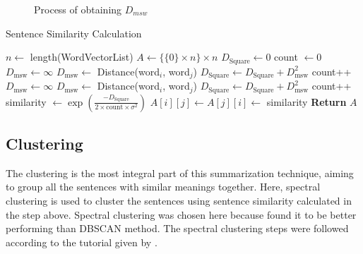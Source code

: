 \begin{figure}
    \centering
    
    \caption{Process of obtaining $D_{msw}$}
    \label{fig:msd}
\end{figure}
\begin{algorithm} \caption{Sentence Similarity Calculation} \label{alg:similarity}
\begin{algorithmic}[1]
    \State $n \gets$ length(WordVectorList)
    \State $A \gets \{ \{0\} \times n \} \times n$
        \State $D_{\text{Square}} \gets 0$
        \State count $\gets 0$
                \State $D_{\text{msw}} \gets \infty$
                        \State $D_{\text{msw}} \gets$ Distance(word$_i$, word$_j$)
                    \EndIf
                \EndFor
                \State $D_{\text{Square}} \gets D_{\text{Square}} + D_{\text{msw}}^2$
                \State count++
            \EndFor
                \State $D_{\text{msw}} \gets \infty$
                        \State $D_{\text{msw}} \gets$ Distance(word$_i$, word$_j$)
                    \EndIf
                \EndFor
                \State $D_{\text{Square}} \gets D_{\text{Square}} + D_{\text{msw}}^2$
                \State count++
            \EndFor
            \State similarity $\gets \exp \left( \frac{- D_{\text{Square}}}{2 \times \text{count} \times \sigma^2} \right)$
            \State $A[i][j] \gets A[j][i] \gets$ similarity
        \EndFor
    \EndFor
    \State \textbf{Return} $A$
\end{algorithmic}
\end{algorithm}

\subsection{Clustering}\label{subsec:clustering}
The clustering is the most integral part of this summarization technique, aiming to group all the sentences with similar meanings together. Here, spectral clustering is used to cluster the sentences using sentence similarity calculated in the step above. Spectral clustering was chosen here because \citeauthor{roychowdhury-etal-2022-spectral-base} \cite{roychowdhury-etal-2022-spectral-base} found it to be better performing than DBSCAN method. The spectral clustering steps were followed according to the tutorial given by \cite{vonLuxburg-2007-spectral-tutorial}. \\

